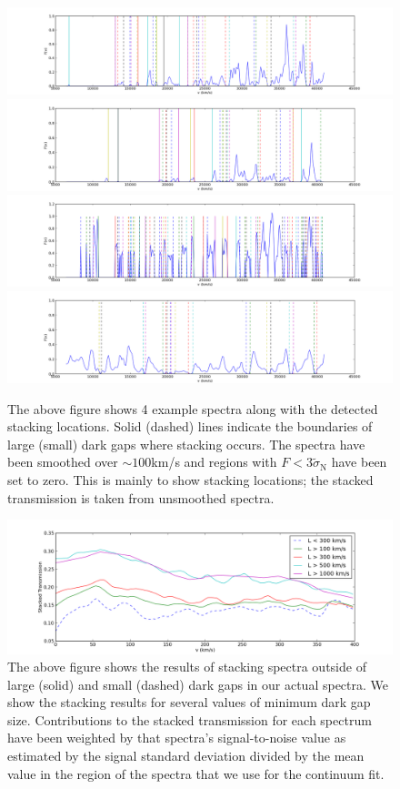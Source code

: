 \documentclass[11pt]{article}
\begin{document}
\begin{figure}[h]
  \centering
  \includegraphics[width=18cm]{figure_1.png}
  \includegraphics[width=18cm]{figure_2.png}
  \includegraphics[width=18cm]{figure_3.png}
  \includegraphics[width=18cm]{figure_4.png}
  \caption{The above figure shows 4 example spectra along with the detected stacking locations. Solid (dashed) lines indicate the boundaries of large (small) dark gaps where stacking occurs. The spectra have been smoothed over $\sim 100$km/s and regions with $F < 3\tilde{\sigma}_{\text{N}}$ have been set to zero. This is mainly to show stacking locations; the stacked transmission is taken from unsmoothed spectra.}
  \label{fig:todo}
\end{figure}

\begin{figure}[h]
  \centering
  \includegraphics[width=18cm]{figure_5.png}
  \caption{The above figure shows the results of stacking spectra outside of large (solid) and small (dashed) dark gaps in our actual spectra. We show the stacking results for several values of minimum dark gap size. Contributions to the stacked transmission for each spectrum have been weighted by that spectra's signal-to-noise value as estimated by the signal standard deviation divided by the mean value in the region of the spectra that we use for the continuum fit.}
  \label{fig:Stacks}
\end{figure}
\end{document}
